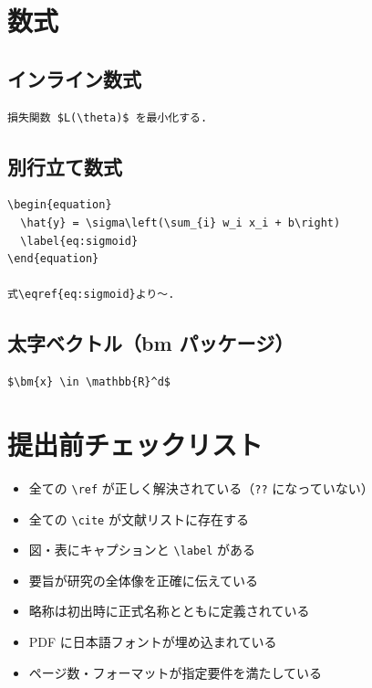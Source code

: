 \documentclass[dvipdfmx, twocolumn, 10pt]{bxjsarticle}
\begin{document}
\section{数式}

\subsection{インライン数式}

\begin{lstlisting}
損失関数 $L(\theta)$ を最小化する.
\end{lstlisting}

\subsection{別行立て数式}

\begin{lstlisting}
\begin{equation}
  \hat{y} = \sigma\left(\sum_{i} w_i x_i + b\right)
  \label{eq:sigmoid}
\end{equation}

式\eqref{eq:sigmoid}より〜.
\end{lstlisting}

\subsection{太字ベクトル（bm パッケージ）}

\begin{lstlisting}
$\bm{x} \in \mathbb{R}^d$
\end{lstlisting}


\section{提出前チェックリスト}

\begin{itemize}
  \item 全ての \texttt{\textbackslash ref} が正しく解決されている（\texttt{??} になっていない）
  \item 全ての \texttt{\textbackslash cite} が文献リストに存在する
  \item 図・表にキャプションと \texttt{\textbackslash label} がある
  \item 要旨が研究の全体像を正確に伝えている
  \item 略称は初出時に正式名称とともに定義されている
  \item PDF に日本語フォントが埋め込まれている
  \item ページ数・フォーマットが指定要件を満たしている
\end{itemize}
\end{document}

